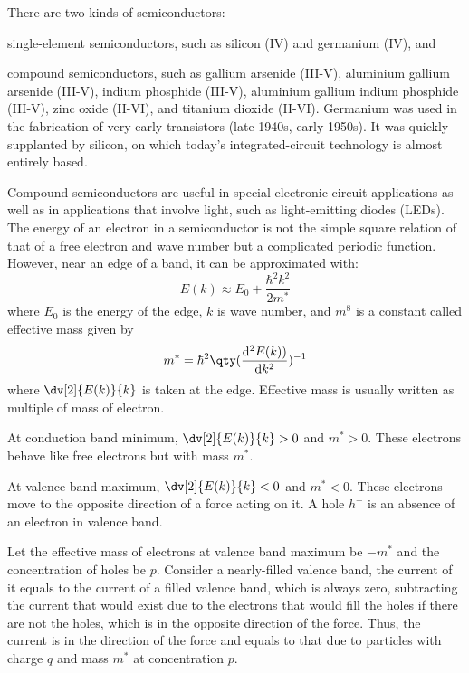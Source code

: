 \documentclass[a4paper,12pt]{article}
\begin{document}
There are two kinds of semiconductors:
\bit
\item single-element semiconductors, such as silicon (IV) and germanium (IV), and
\item compound semiconductors, such as gallium arsenide  (III-V), aluminium gallium arsenide  (III-V), indium phosphide  (III-V), aluminium gallium indium phosphide  (III-V), zinc oxide  (II-VI), and titanium dioxide  (II-VI).
\eit
Germanium was used in the fabrication of very early transistors (late 1940s, early 1950s). It was quickly supplanted by silicon, on which today’s integrated-circuit technology is almost entirely based.

Compound semiconductors are useful in special electronic circuit applications as well as in applications that involve light, such as light-emitting diodes (LEDs).
The energy of an electron in a semiconductor is not the simple square relation of that of a free electron and wave number but a complicated periodic function. However, near an edge of a band, it can be approximated with:
\[E(k) \approx E_0 + \frac{\hbar^2 k^2}{2m^*}\]
where $E_0$ is the energy of the edge, $k$ is wave number, and $m^8$ is a constant called effective mass given by
\[m^*=\hbar^2\qty(\frac{\mathrm{d}^2E(k))}{\mathrm{d}k^2})^{-1}\]
where $\dv[2]{E(k)}{k}$ is taken at the edge. Effective mass is usually written as multiple of mass of electron.
\bit
\item At conduction band minimum, $\dv[2]{E(k)}{k}>0$ and $m^*>0$. These electrons behave like free electrons but with mass $m^*$.
\item At valence band maximum, $\dv[2]{E(k)}{k}<0$ and $m^*<0$. These electrons move to the opposite direction of a force acting on it.
\eit
{}
A hole $h^+$ is an absence of an electron in valence band.

Let the effective mass of electrons at valence band maximum be $-m^*$ and the concentration of holes be $p$. Consider a nearly-filled valence band, the current of it equals to the current of a filled valence band, which is always zero, subtracting the current that would exist due to the electrons that would fill the holes if there are not the holes, which is in the opposite direction of the force. Thus, the current is in the direction of the force and equals to that due to particles with charge $q$ and mass $m^*$ at concentration $p$.
\end{document}
